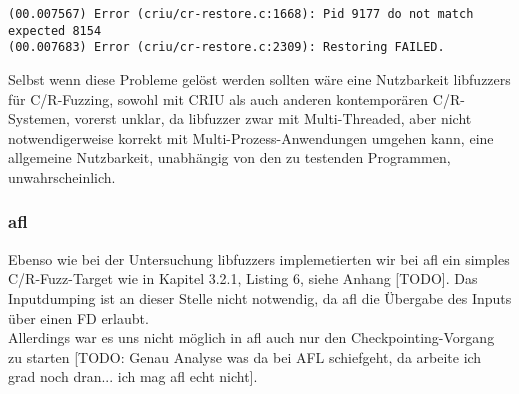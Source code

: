\documentclass[a4paper]{article}
\begin{document}
\begin{lstlisting}[caption=Restoring Error durch PID mismatch]
(00.007567) Error (criu/cr-restore.c:1668): Pid 9177 do not match expected 8154
(00.007683) Error (criu/cr-restore.c:2309): Restoring FAILED.
\end{lstlisting}
Selbst wenn diese Probleme gelöst werden sollten wäre eine Nutzbarkeit libfuzzers für C/R-Fuzzing, sowohl mit CRIU als auch anderen kontemporären C/R-Systemen, vorerst unklar, da libfuzzer zwar mit Multi-Threaded, aber nicht notwendigerweise korrekt mit Multi-Prozess-Anwendungen umgehen kann, eine allgemeine Nutzbarkeit, unabhängig von den zu testenden Programmen, unwahrscheinlich.
\subsubsection{afl}
Ebenso wie bei der Untersuchung libfuzzers implemetierten wir bei afl ein simples C/R-Fuzz-Target wie in Kapitel 3.2.1, Listing 6, siehe Anhang [TODO]. Das Inputdumping ist an dieser Stelle nicht notwendig, da afl die Übergabe des Inputs über einen FD erlaubt.\\
Allerdings war es uns nicht möglich in afl auch nur den Checkpointing-Vorgang zu starten [TODO: Genau Analyse was da bei AFL schiefgeht, da arbeite ich grad noch dran... ich mag afl echt nicht].

\end{document}
